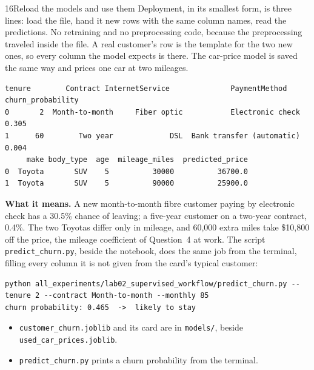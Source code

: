 \begin{labquestion}{16}{Reload the models and use them}
Deployment, in its smallest form, is three lines: load the file, hand it new rows with the same column names, read the predictions. No retraining and no preprocessing code, because the preprocessing traveled inside the file. A real customer's row is the template for the two new ones, so every column the model expects is there. The car-price model is saved the same way and prices one car at two mileages.
\end{labquestion}
\begin{labanswer}

\begin{refoutput}
\begin{lstlisting}[style=utpterminal]
   tenure        Contract InternetService              PaymentMethod  churn_probability
0       2  Month-to-month     Fiber optic           Electronic check              0.305
1      60        Two year             DSL  Bank transfer (automatic)              0.004
     make body_type  age  mileage_miles  predicted_price
0  Toyota       SUV    5          30000          36700.0
1  Toyota       SUV    5          90000          25900.0
\end{lstlisting}
\end{refoutput}

\textbf{What it means.} A new month-to-month fibre customer paying by electronic check has a 30.5\% chance of leaving; a five-year customer on a two-year contract, 0.4\%. The two Toyotas differ only in mileage, and 60,000 extra miles take \$10,800 off the price, the mileage coefficient of Question~4 at work. The script \texttt{predict\_churn.py}, beside the notebook, does the same job from the terminal, filling every column it is not given from the card's typical customer:
\begin{lstlisting}[style=utpterminal]
python all_experiments/lab02_supervised_workflow/predict_churn.py --tenure 2 --contract Month-to-month --monthly 85
churn probability: 0.465  ->  likely to stay
\end{lstlisting}
\end{labanswer}

\begin{labcheckpoint}
\begin{itemize}[leftmargin=1.2em,itemsep=2pt,topsep=1pt]
  \item \texttt{customer\_churn.joblib} and its card are in \texttt{models/}, beside \texttt{used\_car\_prices.joblib}.
  \item \texttt{predict\_churn.py} prints a churn probability from the terminal.
\end{itemize}
\end{labcheckpoint}

